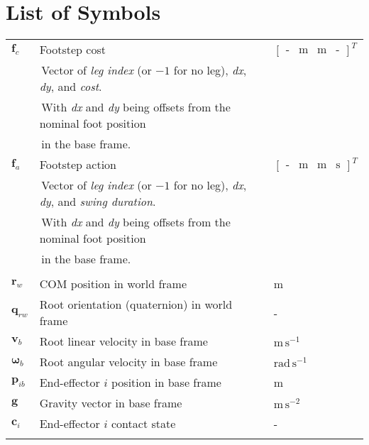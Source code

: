 \chapter*{List of Symbols}


\begin{table}[h!]
  \centering
  \begin{tabular}{lll}
    $\mathbf f_c$ & Footstep cost & $
    \begin{bmatrix}
      \text{-} & \text{m} & \text{m} & \text{-}
    \end{bmatrix}^T$ \\
    & \,\footnotesize{Vector of \textit{leg index} (or $-1$ for no
    leg), \textit{dx}, \textit{dy}, and \textit{cost}.} & \\
    & \,\footnotesize{With \textit{dx} and \textit{dy} being offsets
    from the nominal foot position} & \\
    & \,\footnotesize{in the base frame.} & \\
    $\mathbf f_a$ & Footstep action & $
    \begin{bmatrix}
      \text{-} & \text{m} & \text{m} & \text{s}
    \end{bmatrix}^T$ \\
    & \,\footnotesize{Vector of \textit{leg index} (or $-1$ for no
    leg), \textit{dx}, \textit{dy}, and \textit{swing duration}.} & \\
    & \,\footnotesize{With \textit{dx} and \textit{dy} being offsets
    from the nominal foot position} & \\
    & \,\footnotesize{in the base frame.} & \\
    & & \\

    $\mathbf r_w$ & COM position in world frame & m \\
    $\mathbf q_{rw}$ & Root orientation (quaternion) in world frame & - \\
    $\mathbf v_b$ & Root linear velocity in base frame &
    $\text{m}\,\text{s}^{-1}$ \\
    $\mathbf \omega_b$ & Root angular velocity in base frame &
    $\text{rad}\,\text{s}^{-1}$ \\
    $\mathbf p_{ib}$ & End-effector $i$ position in base frame & m \\
    $\mathbf g$ & Gravity vector in base frame & $\text{m}\,\text{s}^{-2}$ \\
    $\mathbf c_{i}$ & End-effector $i$ contact state & - \\
    & & \\


\end{tabular}
\end{table}
